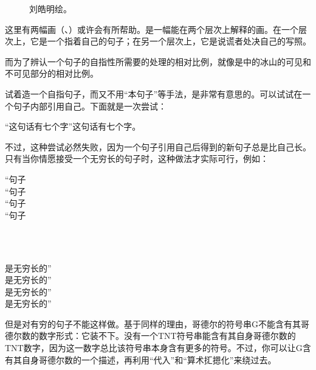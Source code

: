 \begin{figure}
\begin{floatrow}
          {\caption[说谎者处决自己。]{刘皓明绘。}}
\figurebox[\Xhsize]{\usebox\TEMPBOX}
          {\caption[说谎者悖论的冰山。]{}}
\end{floatrow}
\end{figure}

这里有两幅画（、）或许会有所帮助。是一幅能在两个层次上解释的画。在一个层次上，它是一个指着自己的句子；在另一个层次上，它是说谎者处决自己的写照。

而为了辨认一个句子的自指性所需要的处理的相对比例，就像是中的冰山的可见和不可见部分的相对比例。


试着造一个自指句子，而又不用“本句子”等手法，是非常有意思的。可以试试在一个句子内部引用自己。下面就是一次尝试：

\begin{block}
“这句话有七个字”这句话有七个字。
\end{block}

不过，这种尝试必然失败，因为一个句子引用自己后得到的新句子总是比自己长。只有当你情愿接受一个无穷长的句子时，这种做法才实际可行，例如：

\begingroup
“句子\indentcr[\ccwd]\\
\small “句子\\
\footnotesize “句子\\
\scriptsize “句子\strut\\
\indentcr*\\
\scriptsize 是无穷长的”\\
\footnotesize 是无穷长的”\\
\small 是无穷长的”\\
\normalsize 是无穷长的”\par
\endgroup

但是对有穷的句子不能这样做。基于同样的理由，哥德尔的符号串G不能含有其哥德尔数的数字形式：它装不下。没有一个TNT符号串能含有其自身哥德尔数的TNT数字，因为这一数字总比该符号串本身含有更多的符号。不过，你可以让G含有其自身哥德尔数的一个描述，再利用“代入”和“算术㧟摁化”来绕过去。

